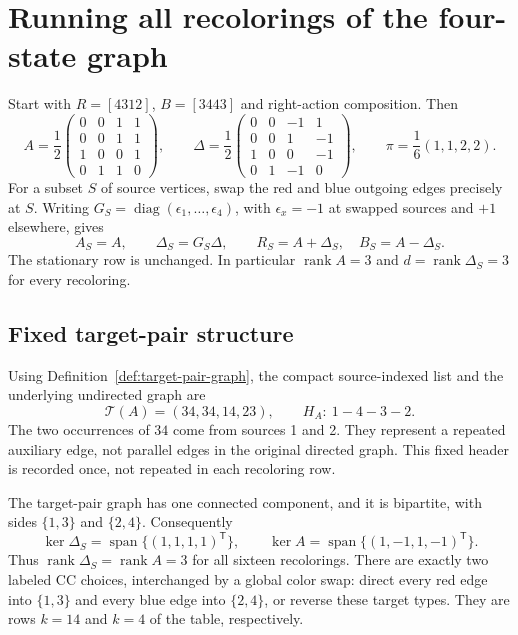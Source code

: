 \section{Running all recolorings of the four-state graph}
\label{app:four-state-recolorings}

Start with $R=[4312]$, $B=[3443]$ and right-action composition.
Then
\[
 A=\frac12\begin{pmatrix}0&0&1&1\\0&0&1&1\\1&0&0&1\\0&1&1&0\end{pmatrix},
 \qquad
 \Delta=\frac12\begin{pmatrix}0&0&-1&1\\0&0&1&-1\\1&0&0&-1\\0&1&-1&0\end{pmatrix},
 \qquad \pi=\frac16(1,1,2,2).
\]
For a subset $S$ of source vertices, swap the red and blue outgoing
edges precisely at $S$. Writing $G_S=\operatorname{diag}(\epsilon_1,
\ldots,\epsilon_4)$, with $\epsilon_x=-1$ at swapped sources and $+1$
elsewhere, gives
\[
 A_S=A,\qquad\Delta_S=G_S\Delta,\qquad
 R_S=A+\Delta_S,\quad B_S=A-\Delta_S.
\]
The stationary row is unchanged. In particular $\operatorname{rank}A=3$
and $d=\operatorname{rank}\Delta_S=3$ for every recoloring.


\subsection*{Fixed target-pair structure}
Using Definition~\ref{def:target-pair-graph}, the compact source-indexed
list and the underlying undirected graph are
\[
 \boxed{\mathcal T(A)=(34,34,14,23),\qquad H_A:\ 1-4-3-2.}
\]
The two occurrences of $34$ come from sources 1 and 2. They represent a
repeated auxiliary edge, not parallel edges in the original directed graph.
This fixed header is recorded once, not repeated in each recoloring row.

The target-pair graph has one connected component, and it is bipartite,
with sides $\{1,3\}$ and $\{2,4\}$. Consequently
\[
 \ker\Delta_S=\operatorname{span}\{(1,1,1,1)^{\mathsf T}\},\qquad
 \ker A=\operatorname{span}\{(1,-1,1,-1)^{\mathsf T}\}.
\]
Thus $\operatorname{rank}\Delta_S=\operatorname{rank}A=3$ for all
sixteen recolorings. There are exactly two labeled CC choices, interchanged
by a global color swap: direct every red edge into $\{1,3\}$ and every
blue edge into $\{2,4\}$, or reverse these target types. They are rows
$k=14$ and $k=4$ of the table, respectively.

